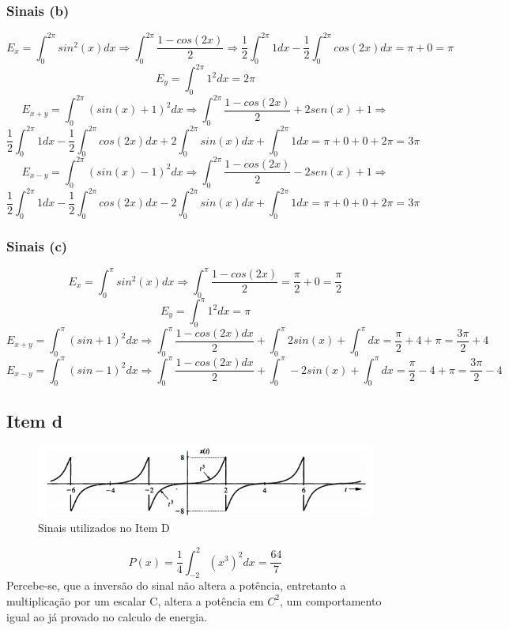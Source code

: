\documentclass[a4paper, 12pt]{article}
\begin{document}
			\subsubsection{Sinais (b)}
			\[E_{x} = \int_{0}^{2\pi} sin^{2}(x)dx \Rightarrow \int_{0}^{2\pi} \frac{1-cos(2x)}{2} \Rightarrow  \frac{1}{2}\int_{0}^{2\pi} 1dx - \frac{1}{2}\int_{0}^{2\pi} cos(2x)dx = \pi + 0 = \pi\]
			\[E_{y} = \int_{0}^{2\pi} 1^{2}dx  = 2\pi \]
			\[E_{x+y} = \int_{0}^{2\pi} (sin(x) +1)^{2}dx \Rightarrow \int_{0}^{2\pi} \frac{1-cos(2x)}{2} + 2sen(x) + 1\Rightarrow\]\[ \frac{1}{2}\int_{0}^{2\pi} 1dx - \frac{1}{2}\int_{0}^{2\pi} cos(2x)dx + 2\int_{0}^{2\pi} sin(x)dx + \int_{0}^{2\pi} 1dx= \pi + 0 + 0 + 2\pi = 3\pi\]
			\[E_{x-y} = \int_{0}^{2\pi} (sin(x) -1)^{2}dx \Rightarrow \int_{0}^{2\pi} \frac{1-cos(2x)}{2} - 2sen(x) + 1\Rightarrow\]\[ \frac{1}{2}\int_{0}^{2\pi} 1dx - \frac{1}{2}\int_{0}^{2\pi} cos(2x)dx - 2\int_{0}^{2\pi} sin(x)dx + \int_{0}^{2\pi} 1dx= \pi + 0 + 0 + 2\pi = 3\pi\]		
			\subsubsection{Sinais (c)}
			\[E_{x} = \int_{0}^{\pi} sin^{2}(x)dx \Rightarrow \int_{0}^{\pi} \frac{1-cos(2x)}{2} = \frac{\pi}{2} + 0 = \frac{\pi}{2} \]
			\[E_{y} = \int_{0}^{\pi} 1^{2}dx = \pi\]
			\[E_{x+y} = \int_{0}^{\pi} (sin + 1)^{2}dx \Rightarrow \int_{0}^{\pi} \frac{1-cos(2x)dx}{2} + \int_{0}^{\pi}2sin(x) + \int_{0}^{\pi}dx = \frac{\pi}{2} + 4 + \pi = \frac{3\pi}{2} + 4\]
			\[E_{x-y} = \int_{0}^{\pi} (sin - 1)^{2}dx \Rightarrow \int_{0}^{\pi} \frac{1-cos(2x)dx}{2} + \int_{0}^{\pi}-2sin(x) + \int_{0}^{\pi}dx = \frac{\pi}{2} - 4 + \pi = \frac{3\pi}{2} - 4\]			
			\newpage				
		\subsection{Item d}	
			\begin{figure}[!ht]
				\centering
				\includegraphics{img/Figura4.png}
				\caption{Sinais utilizados no Item D}	
			\end{figure}
			\[P(x) = \frac{1}{4} \int_{-2}^{2} (x^{3})^{2}dx = \frac{64}{7}\]
			Percebe-se, que a inversão do sinal não altera a potência, entretanto a multiplicação por um escalar C, altera a potência em $C^{2}$, um comportamento igual ao já provado no calculo de energia.
\end{document}

